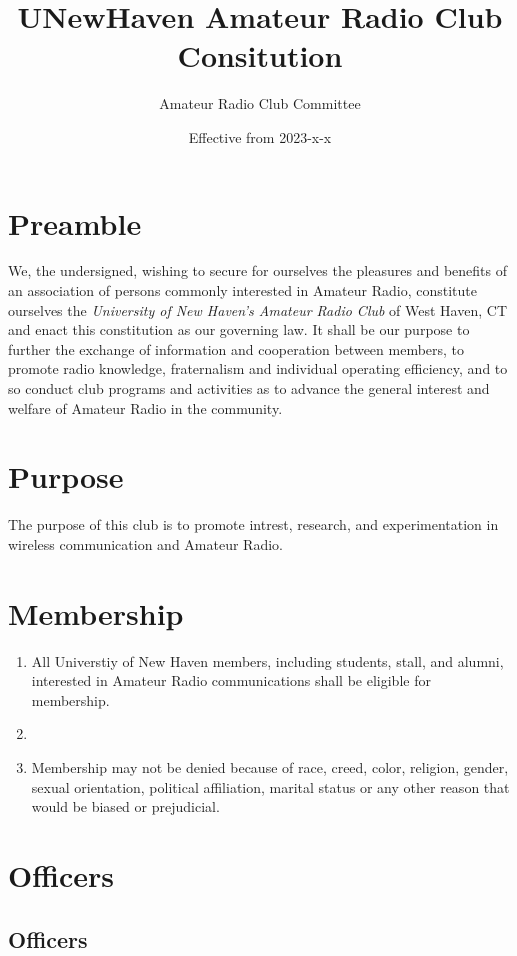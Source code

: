 \documentclass[a4paper,12pt]{article}
\title{UNewHaven Amateur Radio Club Consitution}
\author{Amateur Radio Club Committee}
\date{Effective from 2023-x-x}
\begin{document}
\maketitle

\section{Preamble}
We, the undersigned, wishing to secure for ourselves the pleasures and benefits of an association of
persons commonly interested in Amateur Radio, constitute ourselves the \textit{University of New Haven's Amateur Radio Club}
of West Haven, CT and enact this constitution as our governing law. It shall be our purpose to further the exchange of
information and cooperation between members, to promote radio knowledge, fraternalism and
individual operating efficiency, and to so conduct club programs and activities as to advance the
general interest and welfare of Amateur Radio in the community.

\section{Purpose}
The purpose of this club is to promote intrest, research, and experimentation in wireless communication and Amateur Radio.

\section{Membership}
\begin{enumerate}[label=\thesection.\arabic*.]
  \item All Universtiy of New Haven members, including students, stall, and alumni, interested in Amateur Radio communications shall be eligible for membership.
  \item
  \item Membership may not be denied because of race, creed, color, religion, gender, sexual orientation,
political affiliation, marital status or any other reason that would be biased or prejudicial.
\end{enumerate}
\section{Officers}

\subsection{Officers}
\end{document}
